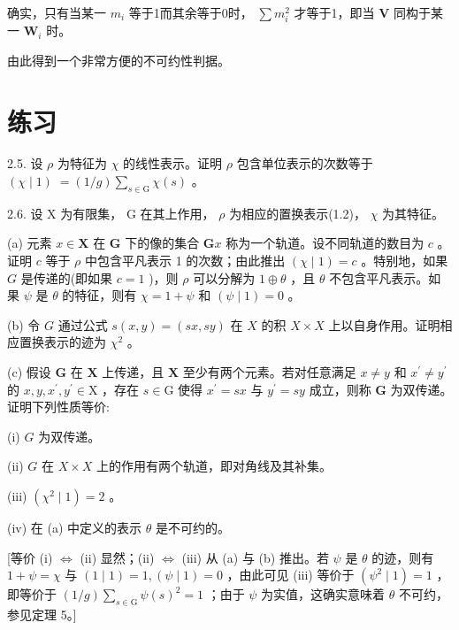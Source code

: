 \documentclass[10pt]{article}
\begin{document}
确实，只有当某一 \({m}_{i}\) 等于1而其余等于0时， \(\sum {m}_{i}^{2}\) 才等于1，即当 \(\mathbf{V}\) 同构于某一 \({\mathbf{W}}_{i}\) 时。

由此得到一个非常方便的不可约性判据。

\section*{练习}

2.5. 设 \(\rho\) 为特征为 \(\chi\) 的线性表示。证明 \(\rho\) 包含单位表示的次数等于 \(\left( {\chi  \mid  1}\right) \; = \left( {1/g}\right) \mathop{\sum }\limits_{{s \in  \mathrm{G}}}\chi \left( s\right)\) 。

2.6. 设 \(\mathrm{X}\) 为有限集， \(\mathrm{G}\) 在其上作用， \(\rho\) 为相应的置换表示(1.2)， \(\chi\) 为其特征。

(a) 元素 \(x \in  \mathbf{X}\) 在 \(\mathbf{G}\) 下的像的集合 \(\mathbf{G}x\) 称为一个轨道。设不同轨道的数目为 \(c\) 。证明 \(c\) 等于 \(\rho\) 中包含平凡表示 1 的次数；由此推出 \(\left( {\chi  \mid  1}\right)  = c\) 。特别地，如果 \(G\) 是传递的(即如果 \(c = 1\) )，则 \(\rho\) 可以分解为 \(1 \oplus  \theta\) ，且 \(\theta\) 不包含平凡表示。如果 \(\psi\) 是 \(\theta\) 的特征，则有 \(\chi  = 1 + \psi\) 和 \(\left( {\psi  \mid  1}\right)  = 0\) 。

(b) 令 \(G\) 通过公式 \(s\left( {x,y}\right)  = \left( {{sx},{sy}}\right)\) 在 \(X\) 的积 \(X \times  X\) 上以自身作用。证明相应置换表示的迹为 \({\chi }^{2}\) 。

(c) 假设 \(\mathbf{G}\) 在 \(\mathbf{X}\) 上传递，且 \(\mathbf{X}\) 至少有两个元素。若对任意满足 \(x \neq  y\) 和 \({x}^{\prime } \neq  {y}^{\prime }\) 的 \(x,y,{x}^{\prime },{y}^{\prime } \in  \mathrm{X}\) ，存在 \(s \in  \mathrm{G}\) 使得 \({x}^{\prime } = {sx}\) 与 \({y}^{\prime } = {sy}\) 成立，则称 \(\mathbf{G}\) 为双传递。证明下列性质等价:

(i) \(G\) 为双传递。

(ii) \(G\) 在 \(X \times  X\) 上的作用有两个轨道，即对角线及其补集。

(iii) \(\left( {{\chi }^{2} \mid  1}\right)  = 2\) 。

(iv) 在 (a) 中定义的表示 \(\theta\) 是不可约的。

[等价 (i) \(\Leftrightarrow\) (ii) 显然；(ii) \(\Leftrightarrow\) (iii) 从 (a) 与 (b) 推出。若 \(\psi\) 是 \(\theta\) 的迹，则有 \(1 + \psi  = \chi\) 与 \(\left( {1 \mid  1}\right)  = 1,\left( {\psi  \mid  1}\right)  = 0\) ，由此可见 (iii) 等价于 \(\left( {{\psi }^{2} \mid  1}\right)  = 1\) ，即等价于 \(\left( {1/g}\right) \mathop{\sum }\limits_{{s \in  \mathrm{G}}}\psi {\left( s\right) }^{2} = 1\) ；由于 \(\psi\) 为实值，这确实意味着 \(\theta\) 不可约，参见定理 5。]
\end{document}
